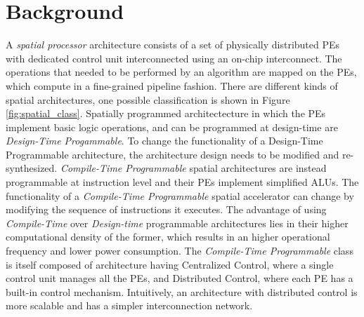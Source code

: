 \section{Background}
\label{sec:bg}
A \textit{spatial processor} architecture consists of a set of physically distributed PEs with dedicated control unit interconnected using an on-chip interconnect. The operations that needed to be performed by an algorithm are mapped on the PEs, which compute in a fine-grained pipeline fashion. There are different kinds of spatial architectures\cite{parashar2014efficient}, one possible classification is shown in Figure \ref{fig:spatial_class}. Spatially programmed architectecture in which the PEs implement basic logic operations, and can be programmed at design-time are \textit{Design-Time Progammable}. To change the functionality of a Design-Time Programmable architecture, the architecture design needs to be modified and re-synthesized. \textit{Compile-Time Programmable} spatial architectures are instead programmable at instruction level and their PEs implement simplified ALUs. The functionality of a \textit{Compile-Time Programmable} spatial accelerator can change by modifying the sequence of instructions it executes.
The advantage of using \textit{Compile-Time} over \textit{Design-time} programmable architectures lies in their higher computational density of the former, which results in an higher operational frequency and lower power consumption.
The \textit{Compile-Time Programmable} class is itself composed of architecture having Centralized Control, where a single control unit manages all the PEs, and Distributed Control, where each PE has a built-in control mechanism. Intuitively, an architecture with distributed control is more scalable and has a simpler interconnection network.


